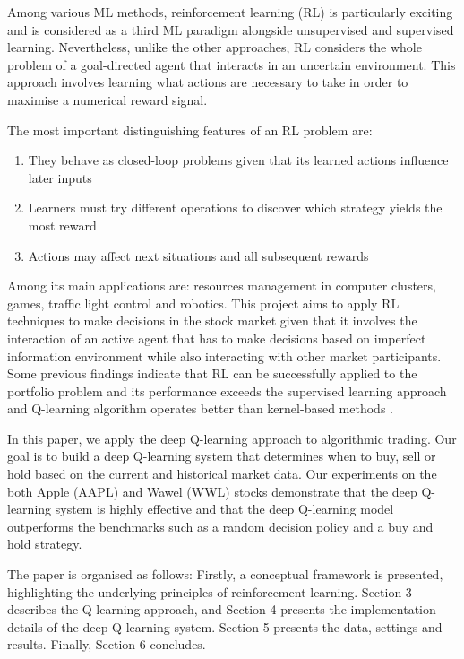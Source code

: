 \documentclass[12pt, authoryear]{elsarticle}
\begin{document}
Among various ML methods, reinforcement learning (RL) is particularly exciting and is considered as a third ML paradigm alongside unsupervised and supervised learning. Nevertheless, unlike the other approaches, RL considers the whole problem of a goal-directed agent that interacts in an uncertain environment. This approach involves learning what actions are necessary to take in order to maximise a numerical reward signal. 

The most important distinguishing features of an RL problem are:
\begin{enumerate}
	\item They behave as closed-loop problems given that its learned actions influence later inputs
	\item Learners must try different operations to discover which strategy yields the most reward
	\item Actions may affect next situations and all subsequent rewards \citep{sutton1998introduction}
\end{enumerate}

Among its main applications are: resources management in computer clusters, games, traffic light control and robotics. This project aims to apply RL techniques to make decisions in the stock market given that it involves the interaction of an active agent that has to make decisions based on imperfect information environment while also interacting with other market participants. Some previous findings indicate that RL can be successfully applied to the portfolio problem and its performance exceeds the supervised learning approach \citep{neuneier1996optimal} and Q-learning algorithm operates better than kernel-based methods \citep{bertoluzzo2012testing}.

In this paper, we apply the deep Q-learning approach to algorithmic trading. Our goal is to build a deep Q-learning system that determines when to buy, sell or hold based on the current and historical market data. Our experiments on
the both Apple (AAPL) and Wawel (WWL) stocks demonstrate that the deep Q-learning system is highly effective and that the deep Q-learning model outperforms the benchmarks such as a random decision policy and a buy and hold strategy.

The paper is organised as follows: Firstly, a conceptual framework is presented, highlighting the underlying principles of reinforcement learning. Section 3 describes the Q-learning approach, and Section 4 presents the implementation details of the deep Q-learning system. Section 5 presents the data, settings and results. Finally, Section 6 concludes.
\end{document}
